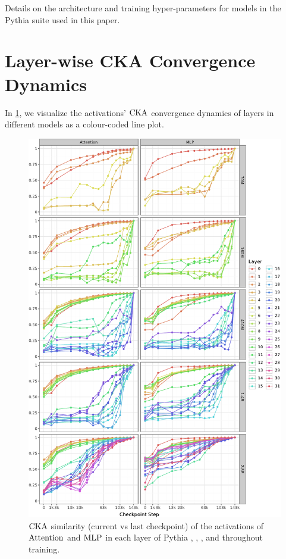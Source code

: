 \begin{table}[!t]
    \centering
    
    \caption{Details on the architecture and training hyper-parameters for models in the Pythia suite used in this paper.}
    \label{tab:model_hparams}
\end{table}

\clearpage

\section{Layer-wise CKA Convergence Dynamics}
\label{app:layerwise-convergence-figures}

In \cref{fig:cka-layer-wise-lines}, we visualize the activations' $\mathrm{CKA}$ convergence dynamics of layers in different models as a colour-coded line plot.
\vspace{0.2cm}

\begin{figure}[h!]
    \centering
    \includegraphics[width=0.90\linewidth]{chapters/tending-towards-stability/figures/cka_full_lines.pdf}
    \vspace{-5pt}
    \caption{$\mathrm{CKA}$ similarity (current vs last checkpoint) of the activations of $\mathrm{Attention}$ and $\mathrm{MLP}$ in each layer of Pythia , , ,  and  throughout training.}%
    \label{fig:cka-layer-wise-lines}
\end{figure}

